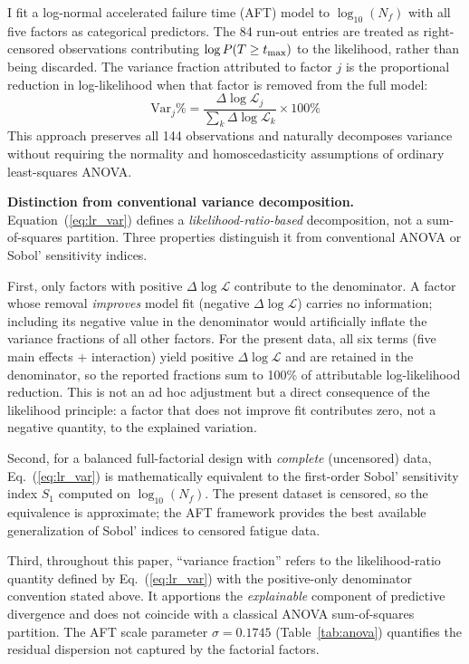 \documentclass[twocolumn,12pt,a4paper]{article}
\begin{document}
I fit a log-normal accelerated failure time (AFT) model to
$\log_{10}(N_f)$ with all five factors as categorical predictors.
The 84 run-out entries are treated as right-censored observations
contributing $\log P(T \geq t_{\rm max})$ to the likelihood, rather
than being discarded. The variance fraction attributed to factor
$j$ is the proportional reduction in log-likelihood when that factor
is removed from the full model:
\begin{equation}
\text{Var}_j\% =
\frac{\Delta\log\mathcal{L}_j}{\sum_k \Delta\log\mathcal{L}_k}
\times 100\%
\label{eq:lr_var}
\end{equation}
This approach
preserves all 144 observations and naturally decomposes variance
without requiring the normality and homoscedasticity assumptions of
ordinary least-squares ANOVA.

\textbf{Distinction from conventional variance decomposition.}
Equation~(\ref{eq:lr_var}) defines a \emph{likelihood-ratio-based}
decomposition, not a sum-of-squares partition. Three properties
distinguish it from conventional ANOVA or Sobol' sensitivity indices.

First, only factors with positive $\Delta\log\mathcal{L}$ contribute
to the denominator. A factor whose removal \emph{improves} model fit
(negative $\Delta\log\mathcal{L}$) carries no information; including
its negative value in the denominator would artificially inflate the
variance fractions of all other factors. For the present data, all
six terms (five main effects + interaction) yield positive
$\Delta\log\mathcal{L}$ and are retained in the denominator, so the
reported fractions sum to 100\% of attributable log-likelihood
reduction. This is not an ad hoc adjustment but a direct consequence
of the likelihood principle: a factor that does not improve fit
contributes zero, not a negative quantity, to the explained
variation.

Second, for a balanced full-factorial design with \emph{complete}
(uncensored) data, Eq.~(\ref{eq:lr_var}) is mathematically equivalent
to the first-order Sobol' sensitivity index $S_1$ computed on
$\log_{10}(N_f)$. The present dataset is censored, so the equivalence
is approximate; the AFT framework provides the best available
generalization of Sobol' indices to censored fatigue data.

Third, throughout this paper, ``variance fraction'' refers to the
likelihood-ratio quantity defined by Eq.~(\ref{eq:lr_var}) with the
positive-only denominator convention stated above. It apportions the
\emph{explainable} component of predictive divergence and does not
coincide with a classical ANOVA sum-of-squares partition. The AFT
scale parameter $\sigma = 0.1745$ (Table~\ref{tab:anova}) quantifies
the residual dispersion not captured by the factorial factors.
\end{document}
